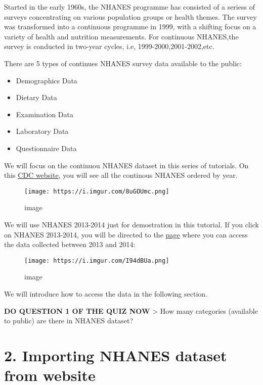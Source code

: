 \documentclass[
]{book}
\begin{document}
Started in the early 1960s, the NHANES programme has consisted of a seriess of surveys concentrating on various population groups or health themes. The survey was transformed into a continuous programme in 1999, with a shifting focus on a variety of health and nutrition measurements. For continuous NHANES,the survey is conducted in two-year cycles, i.e, 1999-2000,2001-2002,etc.

There are 5 types of continues NHANES survey data available to the public:

\begin{itemize}
\item
  Demographics Data
\item
  Dietary Data
\item
  Examination Data
\item
  Laboratory Data
\item
  Questionnaire Data
\end{itemize}

We will focus on the continuou NHANES dataset in this series of tutorials. On this \href{https://wwwn.cdc.gov/nchs/nhanes/}{CDC website}, you will see all the continous NHANES ordered by year.

\begin{figure}
\centering
\texttt{[image: https://i.imgur.com/8uGOUmc.png]}
\caption{image}
\end{figure}

We will use NHANES 2013-2014 just for demostration in this tutorial. If you click on NHANES 2013-2014, you will be directed to the \href{https://wwwn.cdc.gov/nchs/nhanes/continuousnhanes/default.aspx?BeginYear=2013}{page} where you can access the data collected between 2013 and 2014:

\begin{figure}
\centering
\texttt{[image: https://i.imgur.com/I94dBUa.png]}
\caption{image}
\end{figure}

We will introduce how to access the data in the following section.

\textbf{DO QUESTION 1 OF THE QUIZ NOW}
\textgreater{} How many categories (available to public) are there in NHANES dataset?

\hypertarget{importing-nhanes-dataset-from-website}{%
\section{2. Importing NHANES dataset from website}\label{importing-nhanes-dataset-from-website}}
\end{document}

